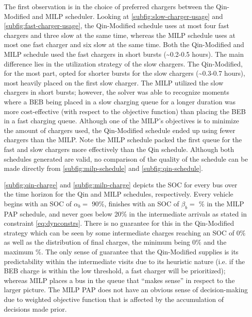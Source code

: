 \documentclass[utf8]{FrontiersinHarvard}
\newcommand{\bcharge}{0.7 }                                                     %
\newcommand{\mincharge}{20\% }                                                  %
\newcommand{\batsize}{388 }                                                     %
\begin{document}
The first observation is in the choice of preferred chargers between the Qin-Modified and MILP scheduler. Looking at
\autoref{subfig:slow-charger-usage} and \autoref{subfig:fast-charger-usage}, the Qin-Modified schedule uses at most four
fast chargers and three slow at the same time, whereas the MILP schedule uses at most one fast charger and six slow at
the same time. Both the Qin-Modified and MILP schedule used the fast chargers in short bursts (\textasciitilde{}0.2-0.5 hours). The main
difference lies in the utilization strategy of the slow chargers. The Qin-Modified, for the most part, opted for shorter
bursts for the slow chargers (\textasciitilde{}0.3-0.7 hours), most heavily placed on the first slow charger. The MILP
utilized the slow chargers in short bursts; however, the solver was able to recognize moments where a BEB being placed
in a slow charging queue for a longer duration was more cost-effective (with respect to the objective function) than
placing the BEB in a fast charging queue. Although one of the MILP's objectives is to minimize the amount of chargers
used, the Qin-Modified schedule ended up using fewer chargers than the MILP. Note the MILP schedule
packed the first queue for the fast and slow chargers more effectively than the Qin schedule. Although both schedules
generated are valid, no comparison of the quality of the schedule can be made directly from
\autoref{subfig:milp-schedule} and \autoref{subfig:qin-schedule}.

\autoref{subfig:qin-charge} and \autoref{subfig:milp-charge} depicts the SOC for every bus over the time horizon for the
Qin and MILP schedules, respectively. Every vehicle begins with an SOC of \(\alpha_b =\) 90\%, finishes with an SOC of \(\beta_b =\)
\fpeval{\bcharge *100}\% in the MILP PAP schedule, and never goes below \mincharge in the intermediate arrivals as stated
in constraint \autoref{eq:dynconstrs}. There is no guarantee for this in the Qin-Modified strategy which can be seen by
some intermediate charges reaching an SOC of 0\% as well as the distribution of final charges, the minimum being 0\% and
the maximum \fpeval{trunc(\fpeval{368 / \batsize * 100}, 3)}\%. The only sense of guarantee that the
Qin-Modified supplies is its predictability within the intermediate visits due to its heuristic nature (i.e. if the BEB
charge is within the low threshold, a fast charger will be prioritized); whereas MILP places a bus in the queue that
``makes sense'' in respect to the larger picture. The MILP PAP does not have an obvious sense of decision-making due to
weighted objective function that is affected by the accumulation of decisions made prior.
\end{document}
